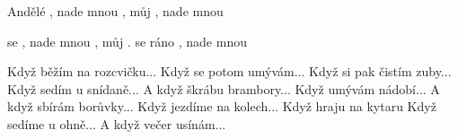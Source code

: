 \begin{TEXT}{Andělé}
\REFREN {},  
 nade mnou , můj 
,   
 nade mnou 

\SLOKA {} se  , 
 nade mnou , můj .
 se ráno , 
 nade mnou 

\SLOKA Když běžím na rozcvičku...
\SLOKA Když se potom umývám...
\SLOKA Když si pak čistím zuby...
\SLOKA Když sedím u snídaně...
\SLOKA A když škrábu brambory...
\SLOKA Když umývám nádobí...
\SLOKA A když sbírám borůvky...
\SLOKA Když jezdíme na kolech...
\SLOKA Když hraju na kytaru
\SLOKA Když sedíme u ohně...
\SLOKA A když večer usínám...
\end{TEXT}